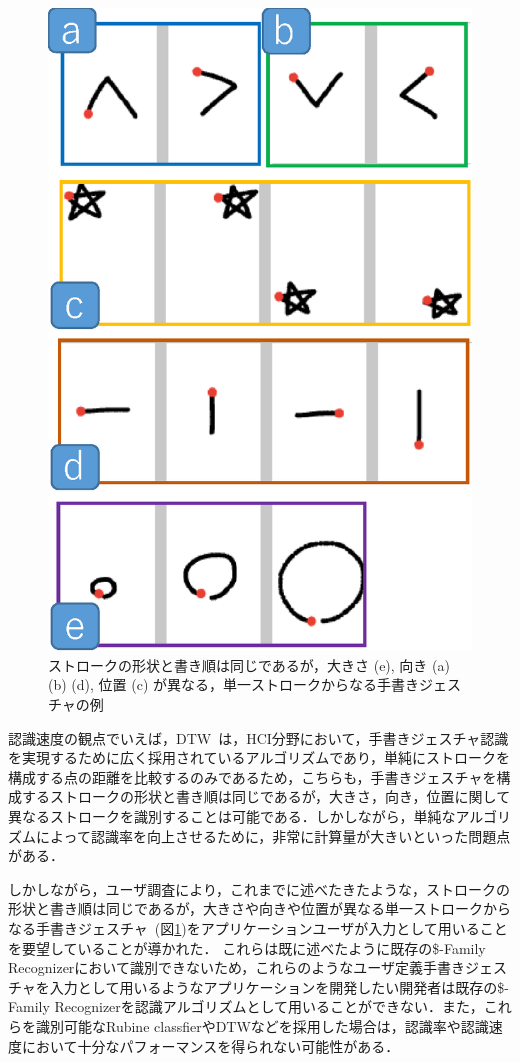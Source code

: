 \begin{figure} [htbp]
\centering
\includegraphics [width=0.5\columnwidth]{img/examples_V.eps}
\caption{ストロークの形状と書き順は同じであるが，大きさ (e), 向き (a) (b) (d), 位置 (c) が異なる，単一ストロークからなる手書きジェスチャの例}
\label{fig:examples_V}
\end{figure}


認識速度の観点でいえば，DTW~\cite{Tappert:1982:CSR:1664966.1664979, Salvador:2007:TAD:1367985.1367993}は，HCI分野において，手書きジェスチャ認識を実現するために広く採用されているアルゴリズムであり，単純にストロークを構成する点の距離を比較するのみであるため，こちらも，手書きジェスチャを構成するストロークの形状と書き順は同じであるが，大きさ，向き，位置に関して異なるストロークを識別することは可能である．しかしながら，単純なアルゴリズムによって認識率を向上させるために，非常に計算量が大きいといった問題点がある．

しかしながら，ユーザ調査により，これまでに述べたきたような，ストロークの形状と書き順は同じであるが，大きさや向きや位置が異なる単一ストロークからなる手書きジェスチャ~(図\ref{fig:examples_V})をアプリケーションユーザが入力として用いることを要望していることが導かれた．
これらは既に述べたように既存の\$-Family Recognizerにおいて識別できないため，これらのようなユーザ定義手書きジェスチャを入力として用いるようなアプリケーションを開発したい開発者は既存の\$-Family Recognizerを認識アルゴリズムとして用いることができない．また，これらを識別可能なRubine classfierやDTWなどを採用した場合は，認識率や認識速度において十分なパフォーマンスを得られない可能性がある．


